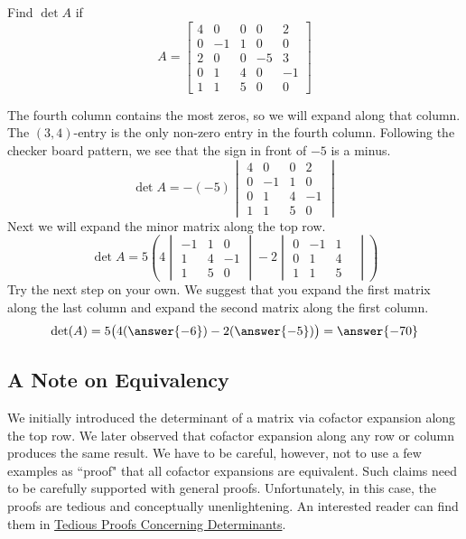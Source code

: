 \documentclass{ximera}
\begin{document}
\begin{example}\label{ex:laplace2}
Find $\det{A}$ if
$$A=\begin{bmatrix}4&0&0&0&2\\0&-1&1&0&0\\2&0&0&-5&3\\0&1&4&0&-1\\1&1&5&0&0\end{bmatrix}$$

\begin{explanation}
The fourth column contains the most zeros, so we will expand along that column.  The  $(3, 4)$-entry is the only non-zero entry in the fourth column.  Following the checker board pattern, we see that the sign in front of $-5$ is a minus.  
$$\det{A}=-(-5)\begin{vmatrix}4&0&0&2\\0&-1&1&0\\0&1&4&-1\\1&1&5&0\end{vmatrix}
$$
Next we will expand the minor matrix along the top row.
$$\det{A}=5\left(4\begin{vmatrix}-1&1&0\\1&4&-1\\1&5&0\end{vmatrix}-2\begin{vmatrix}0&-1&1\\0&1&4&\\1&1&5\end{vmatrix}\right)$$
Try the next step on your own.  We suggest that you expand the first matrix along the last column and expand the second matrix along the first column.
$$\det(A)=5\big(4(\answer{-6})-2(\answer{-5})\big)=\answer{-70}$$
\end{explanation}
\end{example}

\subsection*{A Note on Equivalency}
We initially introduced the determinant of a matrix via cofactor expansion along the top row.  We later observed that cofactor expansion along any row or column produces the same result.  We have to be careful, however, not to use a few examples as ``proof" that all cofactor expansions are equivalent.  Such claims need to be carefully supported with general proofs.  Unfortunately, in this case, the proofs are tedious and conceptually unenlightening.  An interested reader can find them in \href{https://ximera.osu.edu/oerlinalg/LinearAlgebra/DET-0050/main}{Tedious Proofs Concerning Determinants}.
\end{document}
